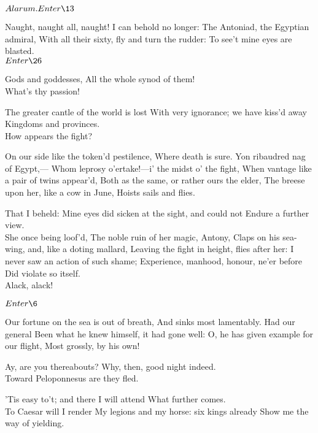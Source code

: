 \documentclass{book}
\begin{document}
	\(Alarum. Enter \13\)

	Naught, naught all, naught! I can behold no longer:
	The Antoniad, the Egyptian admiral,
	With all their sixty, fly and turn the rudder:
	To see't mine eyes are blasted. \\


	\(Enter \26\)

	Gods and goddesses,
	All the whole synod of them! \\

	What's thy passion!

	The greater cantle of the world is lost
	With very ignorance; we have kiss'd away
	Kingdoms and provinces. \\

	How appears the fight?

	On our side like the token'd pestilence,
	Where death is sure. Yon ribaudred nag of Egypt,---
	Whom leprosy o'ertake!---i' the midst o' the fight,
	When vantage like a pair of twins appear'd,
	Both as the same, or rather ours the elder,
	The breese upon her, like a cow in June,
	Hoists sails and flies.

	That I beheld:
	Mine eyes did sicken at the sight, and could not
	Endure a further view. \\

	She once being loof'd,
	The noble ruin of her magic, Antony,
	Claps on his sea-wing, and, like a doting mallard,
	Leaving the fight in height, flies after her:
	I never saw an action of such shame;
	Experience, manhood, honour, ne'er before
	Did violate so itself. \\

	Alack, alack!

	\(Enter \6\)

\6	Our fortune on the sea is out of breath,
	And sinks most lamentably. Had our general
	Been what he knew himself, it had gone well:
	O, he has given example for our flight,
	Most grossly, by his own!

	Ay, are you thereabouts? Why, then, good night
   indeed. \\

\6	Toward Peloponnesus are they fled.

	'Tis easy to't; and there I will attend
	What further comes. \\

\6	To Caesar will I render
	My legions and my horse: six kings already
	Show me the way of yielding. \\
\end{document}
